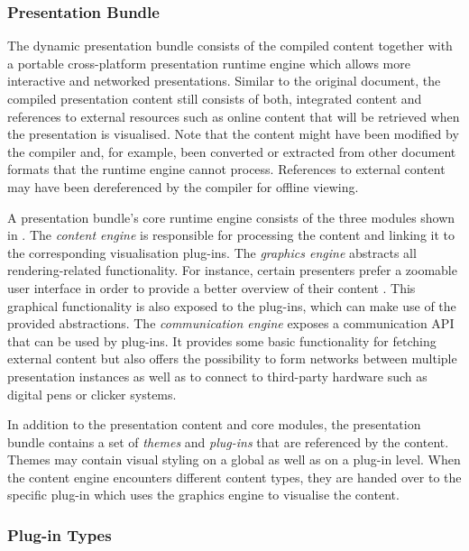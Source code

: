     \subsubsection{\mxp Presentation Bundle}

     The dynamic \mxp presentation bundle consists of the compiled content
     together with a portable cross-platform presentation runtime engine which
     allows more interactive and networked presentations. Similar to the original
     document, the compiled presentation content still consists of both, integrated
     content and references to external resources such as online content that will
     be retrieved when the presentation is visualised. Note that the content might
     have been modified by the compiler and, for example, been converted or
     extracted from other document formats that the runtime engine cannot process.
     References to external content may have been dereferenced by the compiler for
     offline viewing.

     A presentation bundle's core runtime engine consists of the three modules
     shown in . The \emph{content engine} is responsible
     for processing the content and linking it to the corresponding
     visualisation plug-ins. The \emph{graphics engine} abstracts all
     rendering-related functionality. For instance, certain presenters prefer a
     zoomable user interface in order to provide a better overview of their
     content \citep{reuss-1}. This graphical functionality is also exposed to
     the plug-ins, which can make use of the provided abstractions. The
     \emph{communication engine} exposes a communication API that can be used
     by plug-ins. It provides some basic functionality for fetching external
     content but also offers the possibility to form networks between multiple
     \mxp presentation instances as well as to connect to third-party hardware
     such as digital pens or clicker systems.

     In addition to the presentation content and core modules, the presentation
     bundle contains a set of \emph{themes} and \emph{plug-ins} that are referenced
     by the content. Themes may contain visual styling on a global as well as on a
     plug-in level. When the content engine encounters different content types, they
     are handed over to the specific plug-in which uses the graphics engine to
     visualise the content.

    \subsubsection{Plug-in Types}

